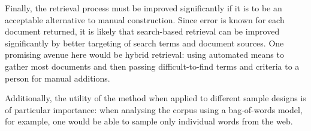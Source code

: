 Finally, the retrieval process must be improved significantly if it is to be an acceptable alternative to manual construction.  Since error is known for each document returned, it is likely that search-based retrieval can be improved significantly by better targeting of search terms and document sources.  One promising avenue here would be hybrid retrieval: using automated means to gather most documents and then passing difficult-to-find terms and criteria to a person for manual additions.

Additionally, the utility of the method when applied to different sample designs is of particular importance: when analysing the corpus using a bag-of-words model, for example, one would be able to sample only individual words from the web.







